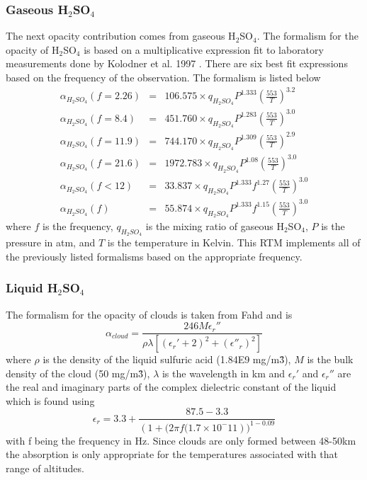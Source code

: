 \subsubsection{Gaseous H$_2$SO$_4$}
The next opacity contribution comes from gaseous H$_2$SO$_4$. The formalism for the opacity of H$_2$SO$_4$ is based on a multiplicative expression fit to laboratory measurements done by Kolodner et al. 1997 \cite{Kolodner-thesis}. There are six best fit expressions based on the frequency of the observation. The formalism is listed below
\begin{eqnarray}
\alpha_{H_2SO_4}(f = 2.26) &=& 106.575 \times q_{H_2SO_4}P^{1.333}\left(\frac{553}{T}\right)^{3.2} \\
\alpha_{H_2SO_4}(f = 8.4)  &=& 451.760 \times q_{H_2SO_4}P^{1.283}\left(\frac{553}{T}\right)^{3.0} \\
\alpha_{H_2SO_4}(f = 11.9) &=& 744.170 \times q_{H_2SO_4}P^{1.309}\left(\frac{553}{T}\right)^{2.9} \\
\alpha_{H_2SO_4}(f = 21.6) &=& 1972.783 \times q_{H_2SO_4}P^{1.08}\left(\frac{553}{T}\right)^{3.0} \\
\alpha_{H_2SO_4}(f < 12)   &=& 33.837 \times q_{H_2SO_4}P^{1.333}f^{1.27}\left(\frac{553}{T}\right)^{3.0} \\
\alpha_{H_2SO_4}(f)        &=& 55.874 \times q_{H_2SO_4}P^{1.333}f^{1.15}\left(\frac{553}{T}\right)^{3.0} 
\end{eqnarray}
where $f$ is the frequency, $q_{H_2SO_4}$ is the mixing ratio of gaseous H$_2$SO$_4$, $P$ is the pressure in atm, and $T$ is the temperature in Kelvin. This RTM implements all of the previously listed formalisms based on the appropriate frequency.

\subsubsection{Liquid H$_2$SO$_4$}
The formalism for the opacity of clouds is taken from Fahd \cite{Fahd-thesis} and is
\begin{equation}
\alpha_{cloud} = \frac{246 M \epsilon_r''}{\rho \lambda \left[ (\epsilon_r' +2)^2 + (\epsilon''_r)^2\right]}
\end{equation}
where $\rho$ is the density of the liquid sulfuric acid (1.84E9 mg/m\^3), $M$ is the bulk density of the cloud (50 mg/m\^3), $\lambda$ is the wavelength in km and $\epsilon_r'$ and $\epsilon_r''$ are the real and imaginary parts of the complex dielectric constant of the liquid which is found using
\begin{equation}
\epsilon_r = 3.3+\frac{87.5-3.3}{\left(1+(2\pi f (1.7\times 10^-11\right))^{1-0.09}}
\end{equation} 
with f being the frequency in Hz. 
Since clouds are only formed between 48-50km the absorption is only appropriate for the temperatures associated with that range of altitudes. 

